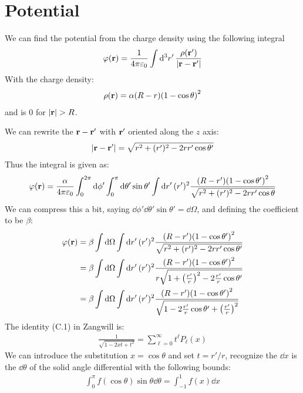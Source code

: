 \documentclass[12pt]{article}
\newcommand{\vphi}{\varphi}
\begin{document}
\section{Potential}
We can find the potential from the charge density using the following integral
\begin{align*}
  \vphi(\vb{r})=\frac1{4\pi\varepsilon_0}\int\dd[3]{r'}
  \frac{\rho(\vb{r}')}{\abs{\vb{r-r}'}}
\end{align*}
With the charge density:
\begin{align*}
  \rho(\vb{r})=\alpha(R-r)\qty(1-\cos\theta)^2
\end{align*}
and is $0$ for $\abs{\vb{r}}>R$.

We can rewrite the $\vb{r-r}'$ with $\vb{r}'$ oriented along the $z$ axis:
\begin{align*}
  \abs{\vb{r-r}'}=\sqrt{r^2+(r')^2-2rr'\cos\theta'}
\end{align*}
Thus the integral is given as:
\begin{align*}
  \vphi(\vb{r})=\frac\alpha{4\pi\varepsilon_0}
  \int_0^{2\pi}\dd{\phi'}
  \int_0^\pi\dd{\theta'}\sin\theta'
  \int\dd{r'}(r')^2\frac{(R-r')\qty(1-\cos\theta')^2}
  {\sqrt{r^2+(r')^2-2rr'\cos\theta}}
\end{align*}
We can compress this a bit, saying $\dd{\phi'}\dd{\theta'}\sin\theta'=\dd{\Omega}$, and defining the coefficient to be $\beta$:
\begin{align*}
  \vphi(\vb{r})&=\beta\int\dd{\Omega}\int\dd{r'}(r')^2
  \frac{(R-r')\qty(1-\cos\theta')^2}{\sqrt{r^2+(r')^2-2rr'\cos\theta'}}\\
  &=\beta\int\dd{\Omega}\int\dd{r'}(r')^2
  \frac{(R-r')\qty(1-\cos\theta')^2}
  {r\sqrt{1+\qty(\frac{r'}{r})^2-2\frac{r'}{r}\cos\theta'}}\\
  &=\beta\int\dd{\Omega}\int\dd{r'}(r')^2
  \frac{(R-r')\qty(1-\cos\theta')^2}
  {\sqrt{1-2\frac{r'}{r}\cos\theta'+\qty(\frac{r'}{r})^2}}\\
\end{align*}
The identity (C.1) in Zangwill is:
\begin{align*}
  \frac1{\sqrt{1-2xt+t^2}}=\sum_{\ell=0}^\infty t^\ell P_{\ell}(x)
\end{align*}
We can introduce the substitution $x=\cos\theta$ and set $t=r'/r$, recognize the $\dd{x}$ is the $\dd{\theta}$ of the solid angle differential with the following bounds:
\begin{align*}
  \int_{0}^\pi f(\cos\theta)\sin\theta\dd{\theta}=
  \int_{-1}^1f(x)\dd{x}
\end{align*}
\end{document}
